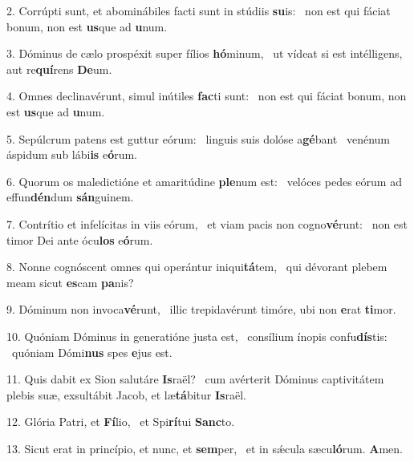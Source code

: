 2. Corrúpti sunt, et abominábiles facti sunt in stúdiis \textbf{su}is: \ast\  non est qui fáciat bonum, non est \textbf{us}que ad \textbf{u}num.\

3. Dóminus de cælo prospéxit super fílios \textbf{hó}minum, \ast\  ut vídeat si est intélligens, aut re\textbf{quí}rens \textbf{De}um.\

4. Omnes declinavérunt, simul inútiles \textbf{fac}ti sunt: \ast\  non est qui fáciat bonum, non est \textbf{us}que ad \textbf{u}num.\

5. Sepúlcrum patens est guttur eórum: \dag\  linguis suis dolóse a\textbf{gé}bant \ast\  venénum áspidum sub lábi\textbf{is} e\textbf{ó}rum.\

6. Quorum os maledictióne et amaritúdine \textbf{ple}num est: \ast\  velóces pedes eórum ad effun\textbf{dén}dum \textbf{sán}guinem.\

7. Contrítio et infelícitas in viis eórum, \dag\  et viam pacis non cogno\textbf{vé}runt: \ast\  non est timor Dei ante ócu\textbf{los} e\textbf{ó}rum.\

8. Nonne cognóscent omnes qui operántur iniqui\textbf{tá}tem, \ast\  qui dévorant plebem meam sicut \textbf{es}cam \textbf{pa}nis?\

9. Dóminum non invoca\textbf{vé}runt, \ast\  illic trepidavérunt timóre, ubi non \textbf{e}rat \textbf{ti}mor.\

10. Quóniam Dóminus in generatióne justa est, \dag\  consílium ínopis confu\textbf{dís}tis: \ast\  quóniam Dómi\textbf{nus} spes \textbf{e}jus est.\

11. Quis dabit ex Sion salutáre \textbf{Is}raël? \ast\  cum avérterit Dóminus captivitátem plebis suæ, exsultábit Jacob, et læ\textbf{tá}bitur \textbf{Is}raël.\

12. Glória Patri, et \textbf{Fí}lio, \ast\  et Spi\textbf{rí}tui \textbf{Sanc}to.\

13. Sicut erat in princípio, et nunc, et \textbf{sem}per, \ast\  et in sǽcula sæcu\textbf{ló}rum. \textbf{A}men.\

